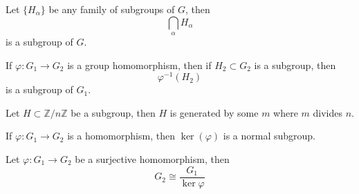 \documentclass[openany]{book}
\newcommand{\Z}{\mathbb{Z}}
\begin{document}

\begin{prop}
    Let $\{H_\alpha\}$ be any family of subgroups of $G$, then 
    \begin{equation*}
        \bigcap_\alpha H_\alpha
    \end{equation*}
    is a subgroup of $G$.
\end{prop}

\begin{prop}
    If $\varphi: G_1\to G_2$ is a group homomorphism, then if $H_2\subset G_2$ is a subgroup, then 
    \begin{equation*}
        \varphi^{-1}(H_2)
    \end{equation*}
    is a subgroup of $G_1$.
\end{prop}

\begin{prop}
    Let $H\subset\Z/n\Z$ be a subgroup, then $H$ is generated by some $m$ where $m$ divides $n$.
\end{prop}


\begin{prop}
    If $\varphi: G_1\to G_2$ is a homomorphism, then $\ker(\varphi)$ is a normal subgroup.
\end{prop}


\begin{prop}
    Let $\varphi:G_1\to G_2$ be a surjective homomorphism, then 
    \begin{equation*}
        G_2\cong\frac{G_1}{\ker\varphi}
    \end{equation*}
\end{prop}
\end{document}
